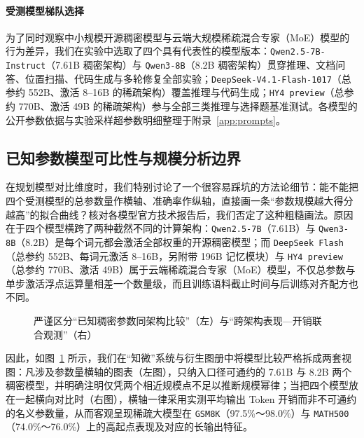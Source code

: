\paragraph{受测模型梯队选择}为了同时观察中小规模开源稠密模型与云端大规模稀疏混合专家（MoE）模型的行为差异，我们在实验中选取了四个具有代表性的模型版本：\texttt{Qwen2.5-7B-Instruct}（7.61B 稠密架构）与 \texttt{Qwen3-8B}（8.2B 稠密架构）贯穿推理、文档问答、位置扫描、代码生成与多轮修复全部实验；\texttt{DeepSeek-V4.1-Flash-1017}（总参约 552B、激活 8–16B 的稀疏架构）覆盖推理与代码生成；\texttt{HY4 preview}（总参约 770B、激活 49B 的稀疏架构）参与全部三类推理与选择题基准测试。各模型的公开参数依据与实验采样超参数明细整理于附录~\ref{app:prompts}。

\subsection{已知参数模型可比性与规模分析边界}

在规划模型对比维度时，我们特别讨论了一个很容易踩坑的方法论细节：能不能把四个受测模型的总参数量作横轴、准确率作纵轴，直接画一条“参数规模越大得分越高”的拟合曲线？核对各模型官方技术报告后，我们否定了这种粗糙画法。原因在于四个模型横跨了两种截然不同的计算架构：\texttt{Qwen2.5-7B}（7.61B）与 \texttt{Qwen3-8B}（8.2B）是每个词元都会激活全部权重的开源稠密模型；而 \texttt{DeepSeek Flash}（总参约 552B、每词元激活 8–16B，另附带 196B 记忆模块）与 \texttt{HY4 preview}（总参约 770B、激活 49B）属于云端稀疏混合专家（MoE）模型，不仅总参数与单步激活浮点运算量相差一个数量级，而且训练语料截止时间与后训练对齐配方也不同。

\begin{figure}[!htbp]
\centering
{}\hfill
{}
\caption{严谨区分“已知稠密参数同架构比较”（左）与“跨架构表现—开销联合观测”（右）}
\label{fig:scale-boundary}
\end{figure}

因此，如图~\ref{fig:scale-boundary} 所示，我们在“知微”系统与衍生图册中将模型比较严格拆成两套视图：凡涉及参数量横轴的图表（左图），只纳入口径可通约的 7.61B 与 8.2B 两个稠密模型，并明确注明仅凭两个相近规模点不足以推断规模幂律；当把四个模型放在一起横向对比时（右图），横轴一律采用实测平均输出 Token 开销而非不可通约的名义参数量，从而客观呈现稀疏大模型在 \texttt{GSM8K}（97.5\%～98.0\%）与 \texttt{MATH500}（74.0\%～76.0\%）上的高起点表现及对应的长输出特征。
